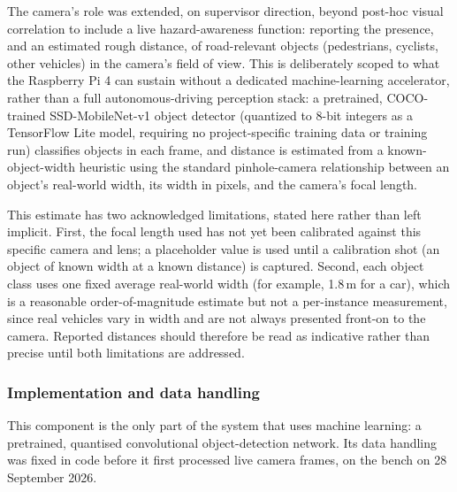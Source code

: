 The camera's role was extended, on supervisor direction, beyond post-hoc visual correlation to include a live hazard-awareness function: reporting the presence, and an estimated rough distance, of road-relevant objects (pedestrians, cyclists, other vehicles) in the camera's field of view. This is deliberately scoped to what the Raspberry Pi 4 can sustain without a dedicated machine-learning accelerator, rather than a full autonomous-driving perception stack: a pretrained, COCO-trained SSD-MobileNet-v1 object detector (quantized to 8-bit integers as a TensorFlow Lite model, requiring no project-specific training data or training run) classifies objects in each frame, and distance is estimated from a known-object-width heuristic using the standard pinhole-camera relationship between an object's real-world width, its width in pixels, and the camera's focal length.

This estimate has two acknowledged limitations, stated here rather than left implicit. First, the focal length used has not yet been calibrated against this specific camera and lens; a placeholder value is used until a calibration shot (an object of known width at a known distance) is captured. Second, each object class uses one fixed average real-world width (for example, 1.8\,m for a car), which is a reasonable order-of-magnitude estimate but not a per-instance measurement, since real vehicles vary in width and are not always presented front-on to the camera. Reported distances should therefore be read as indicative rather than precise until both limitations are addressed.

\subsubsection*{Implementation and data handling}

This component is the only part of the system that uses machine learning: a pretrained, quantised convolutional object-detection network. Its data handling was fixed in code before it first processed live camera frames, on the bench on 28 September 2026.


